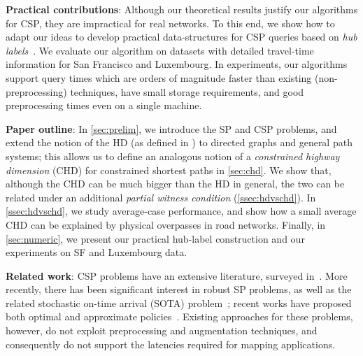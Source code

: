 \noindent\textbf{Practical contributions}: 
Although our theoretical results justify our algorithms for CSP, they are impractical for real networks. 
To this end, we show how to adapt our ideas to develop practical data-structures for CSP queries based on {\em hub labels}~\cite{cohen_definition_hl}. 
We evaluate our algorithm on datasets with detailed travel-time information for San Francisco and Luxembourg.
In experiments, our algorithms support query times which are orders of magnitude faster than existing (non-preprocessing) techniques, have small storage requirements, and good preprocessing times even on a single machine. 

\noindent\textbf{Paper outline}:
In \cref{sec:prelim}, we introduce the SP and CSP problems, and extend the notion of the HD (as defined in \cite{highway2013}) to directed graphs and general path systems; this allows us to define an analogous notion of a \emph{constrained highway dimension} (CHD) for constrained shortest paths in \cref{sec:chd}. 
We show that, although the CHD can be much bigger than the HD in general, the two can be related under an additional \emph{partial witness condition} (\cref{ssec:hdvschd}). 
In \cref{ssec:hdvschd}, we study average-case performance, and show how a small average CHD can be explained by physical overpasses in road networks. 
Finally, in \cref{sec:numeric}, we present our practical hub-label construction and our experiments on SF and Luxembourg data.


\noindent\textbf{Related work}:
CSP problems have an extensive literature, surveyed in~\cite{csp_survey}. 
More recently, there has been significant interest in robust SP problems, as well as the related stochastic on-time arrival (SOTA) problem~\cite{fan2005arriving}; recent works have proposed both optimal and approximate policies~\cite{sabran2014precomputation,nikolova_discretization}. 
Existing approaches for these problems, however, do not exploit preprocessing and augmentation techniques, and consequently do not support the latencies required for mapping applications.

